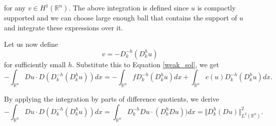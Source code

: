 \documentclass{article}
\begin{document}
for any $v\in H^1(\mathbb{R}^n)$. The above integration is defined since $u$ is compactly supported and we can choose large enough ball that contains the support of $u$ and integrate these expressions over it.\\
\par Let us now define 
\begin{equation*}
v = -D_k^{-h}(D_k^hu)
\end{equation*}
for sufficiently small $h$. Substitute this to Equation \ref{weak_sol}, we get
\begin{equation*}
-\int_{\mathbb{R}^n} Du\cdot D(D_k^{-h}(D_k^hu))dx = -\int_{\mathbb{R}^n} fD_k^{-h}(D_k^h u)dx + \int_{\mathbb{R}^n}c(u)D_k^{-h}(D_k^hu)dx.
\end{equation*}

By applying the integration by parts of difference quotients, we derive
\begin{equation*}
-\int_{\mathbb{R}^n} Du\cdot D(D_k^{-h}(D_k^hu))dx = \int_{\mathbb{R}^n} D_k^{-h}Du\cdot (D_k^hDu))dx=\Vert D_k^h(Du)\Vert^2_{L^2(\mathbb{R}^n)}.
\end{equation*}
\end{document}
